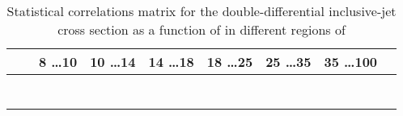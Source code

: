 \clearpage
\phantom{x}
\vspace{0.2\textheight}
\begin{longtable}[p!]{cc|ccccccc}
	\centering
			& & 8 \dots 10     & 10 \dots 14    & 14 \dots 18    &  18 \dots 25    &  25 \dots 35    & 35 \dots 100  &  \\
			\hline   \\ \hline
			
			\hline  \\ \hline 
			
			\hline  \\ \hline
			
			\hline  \\ 
			\newpage
			\hline 
			
			\hline  \\ \hline
			
			\hline  \\ \hline 
			
			\hline
		
	\caption{Statistical correlations matrix for the double-differential inclusive-jet cross section as a function of \etjetb in different regions of \qsq}
	\label{tab:StatisticalCorrelationsMatrix}
\end{longtable}